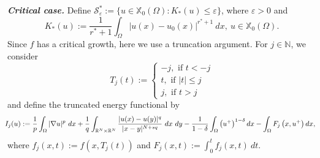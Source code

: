 \documentclass[reqno,oneside]{amsart}
\theoremstyle{definition}
\theoremstyle{remark}
\numberwithin{equation}{section}
\newcommand{\Om} {\Omega}
\newcommand{\sr}{\mathbb{R}}
\newcommand{\na} {\nabla}
\newcommand{\sn}{\mathbb{N}}
\newcommand{\xo}{\mathbb{X}_0}
\begin{document}
\noindent\textbf{\textit{Critical case.}} Define $ \mathcal{S}^*_{\varepsilon}:= \{u\in \xo(\Om) : K_*(u) \leq \varepsilon\}$, where $\varepsilon>0$ and
\[ K_*(u):= \frac{1}{r^* +1} \int_{\Om} |u(x) -u_0 (x)|^{r^* +1}\ dx,\ u\in \xo(\Om).\]
Since $f$ has a critical growth,  here we use a truncation argument. For $j\in \sn$, we consider
\[T_j (t):= \begin{cases}
    -j, \text{ if } t < -j\\
    t, \text{ if } |t|\leq j\\
    j, \text{ if } t > j
\end{cases} \]
and define the truncated energy functional by
\begin{equation*}
    \hspace{-4pt}I_j (u):= \frac{1}{p} \int_{\Om} |\na u|^p\ dx + \frac{1}{q} \int_{\sr^N \times \sr^N} \frac{|u(x) - u(y)|^{q}}{|x-y|^{N+sq}}\ dx\ dy - \frac{1}{1-\delta} \int_{\Om} \left(u^+ \right)^{1-\delta} dx - \int_{\Om} F_j \left(x,u^+ \right) dx,
\end{equation*}
where $f_j(x,t):= f(x, T_j (t))$ and $F_j (x,t):= \int_0^t f_j (x,t)\ dt$.
\end{document}
